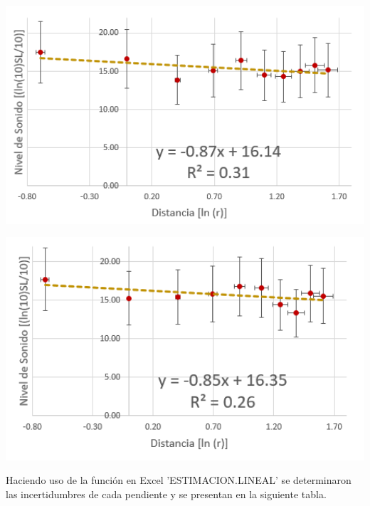 \documentclass[DIV=calc, paper=a4, fontsize=11pt]{scrartcl}
\newenvironment{Figura}
  {\par\medskip\noindent\minipage{\linewidth}}
  {\endminipage\par\medskip}
\begin{document}
\begin{multicols}{2}
\begin{Figura}
\centering
    \includegraphics[width=1\textwidth]{grafica 900 Hz.PNG}
    \label{fig}
\end{Figura}


\begin{Figura}
\centering
    \includegraphics[width=1\textwidth]{grafica 1000 Hz.PNG}
    \label{fig}
\end{Figura}

Haciendo uso de la función en Excel 'ESTIMACION.LINEAL' se determinaron las incertidumbres de cada pendiente y se presentan en la siguiente tabla.



\end{multicols}
\end{document}
